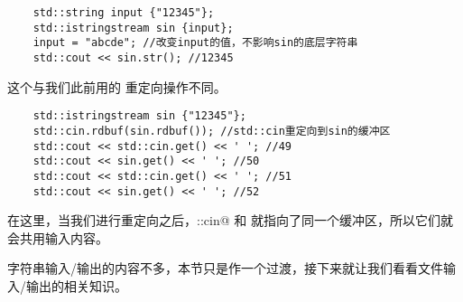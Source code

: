 \begin{lstlisting}
    std::string input {"12345"};
    std::istringstream sin {input};
    input = "abcde"; //改变input的值，不影响sin的底层字符串
    std::cout << sin.str(); //12345
\end{lstlisting}
这个与我们此前用的 \lstinline@rdbuf@ 重定向操作不同。
\begin{lstlisting}
    std::istringstream sin {"12345"};
    std::cin.rdbuf(sin.rdbuf()); //std::cin重定向到sin的缓冲区
    std::cout << std::cin.get() << ' '; //49
    std::cout << sin.get() << ' '; //50
    std::cout << std::cin.get() << ' '; //51
    std::cout << sin.get() << ' '; //52
\end{lstlisting}
在这里，当我们进行重定向之后，\lstinline@std::cin@ 和 \lstinline@sin@ 就指向了同一个缓冲区，所以它们就会共用输入内容。\par
字符串输入/输出的内容不多，本节只是作一个过渡，接下来就让我们看看文件输入/输出的相关知识。\par
